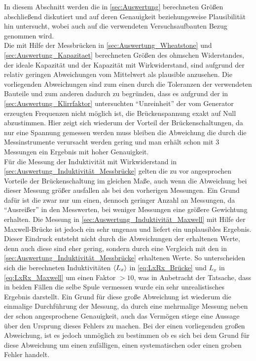 In diesem Abschnitt werden die in \cref{sec:Auswertung} berechneten 
Größen abschließend diskutiert und auf deren Genauigkeit beziehungsweise
Plausibilität hin untersucht, wobei auch auf die verwendeten
Versuchsaufbauten Bezug genommen wird.\\

Die mit Hilfe der Messbrücken in \cref{sec:Auswertung_Wheatstone} und \cref{sec:Auswertung_Kapazitaet} 
berechneten Größen des ohmschen Widerstandes, der ideale Kapazität und der Kapazität mit Wirkwiderstand,
sind aufgrund der relativ geringen Abweichungen vom Mittelwert als plausible anzusehen. 
Die vorliegenden Abweichungen  sind zum einen durch die Toleranzen der verwendeten Bauteile 
und zum anderen dadurch zu begründen, dass es aufgrund der in \cref{sec:Auswertung_Klirrfaktor} untersuchten
\enquote{Unreinheit} der vom Generator erzeugten Frequenzen nicht möglich ist, die Brückenspannung exakt 
auf Null abzustimmen.  
Hier zeigt sich wiederum der Vorteil der Brückenschaltungen, da nur eine Spannung gemessen werden muss
bleiben die Abweichung die durch die Messinstrumente verursacht werden gering und man erhält schon  
mit 3 Messungen ein Ergebnis mit hoher Genauigkeit.\\
  
Für die Messung der Induktivität mit Wirkwiderstand in \cref{sec:Auswertung_Induktivität_Messbrücke}
gelten die zu vor angesprochen Vorteile der Brückenschaltung im gleichen Maße, auch wenn die
Abweichung bei dieser Messung größer ausfallen als bei den vorherigen Messungen. Ein Grund dafür ist  
die zwar nur um einen, dennoch geringer Anzahl an Messungen, da \enquote{Ausreißer} in den Messwerten,
bei weniger Messungen eine größere Gewichtung erhalten.  
Die Messung in \cref{sec:Auswertung_Induktivität_Maxwell} mit Hilfe der Maxwell-Brücke ist jedoch
ein sehr ungenau und liefert ein unplausibles Ergebnis. Dieser Eindruck entsteht nicht durch die Abweichungen der
erhaltenen Werte, denn auch diese sind eher gering, sondern durch eine Vergleich mit den in
\cref{sec:Auswertung_Induktivität_Messbrücke} erhaltenen Werte. So unterscheiden sich die berechneten Induktivitäten
$\langle L_{x}\rangle$ in \cref{eq:LxRx_Brücke} und $L_{x}$ in \cref{eq:LxRx_Maxwell} um einen Faktor $> 10$, was in Anbetracht der 
Tatsache, dass in beiden Fällen die selbe Spule vermessen wurde ein sehr unrealistisches Ergebnis darstellt.
Ein Grund für diese große Abweichung ist wiederum die einmalige Durchführung der Messung, da durch eine mehrmalige
Messung neben der schon angesprochene Genauigkeit, auch das Vermögen stiege eine Aussage über den Ursprung dieses Fehlers zu 
machen. Bei der einen vorliegenden großen Abweichung, ist es jedoch unmöglich zu bestimmen ob es sich bei
dem Grund für diese Abweichung um einen zufälligen, einen systematischen oder einen groben Fehler handelt.\\
\pagebreak

